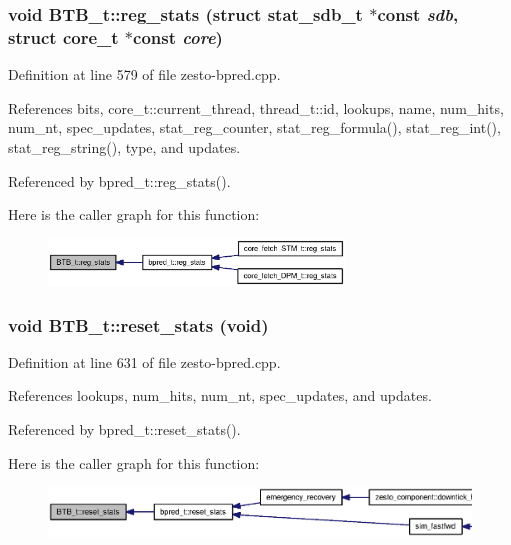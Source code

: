 \subsubsection[{reg\_\-stats}]{\setlength{\rightskip}{0pt plus 5cm}void BTB\_\-t::reg\_\-stats (struct {\bf stat\_\-sdb\_\-t} $\ast$const  {\em sdb}, \/  struct {\bf core\_\-t} $\ast$const  {\em core})\hspace{0.3cm}{\tt  [virtual]}}\label{classBTB__t_6987bbb8bee1289335a9ec57bd1226e5}




Definition at line 579 of file zesto-bpred.cpp.

References bits, core\_\-t::current\_\-thread, thread\_\-t::id, lookups, name, num\_\-hits, num\_\-nt, spec\_\-updates, stat\_\-reg\_\-counter, stat\_\-reg\_\-formula(), stat\_\-reg\_\-int(), stat\_\-reg\_\-string(), type, and updates.

Referenced by bpred\_\-t::reg\_\-stats().

Here is the caller graph for this function:\nopagebreak
\begin{figure}[H]
\begin{center}
\leavevmode
\includegraphics[width=223pt]{classBTB__t_6987bbb8bee1289335a9ec57bd1226e5_icgraph}
\end{center}
\end{figure}
\subsubsection[{reset\_\-stats}]{\setlength{\rightskip}{0pt plus 5cm}void BTB\_\-t::reset\_\-stats (void)\hspace{0.3cm}{\tt  [virtual]}}\label{classBTB__t_daa5ae0e0ee266058334c4c39ffb8bc7}




Definition at line 631 of file zesto-bpred.cpp.

References lookups, num\_\-hits, num\_\-nt, spec\_\-updates, and updates.

Referenced by bpred\_\-t::reset\_\-stats().

Here is the caller graph for this function:\nopagebreak
\begin{figure}[H]
\begin{center}
\leavevmode
\includegraphics[width=420pt]{classBTB__t_daa5ae0e0ee266058334c4c39ffb8bc7_icgraph}
\end{center}
\end{figure}
